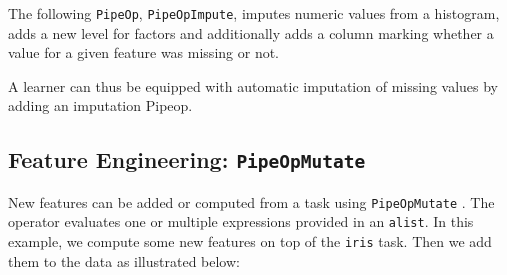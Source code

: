 \documentclass[
  11pt,
  parskip=half,
  DIV=calc,
  BCOR=10mm,
  x11names]{scrbook}
\newenvironment{Shaded}{}{}
\newcommand{\DataTypeTok}[1]{#1}
\newcommand{\KeywordTok}[1]{\textcolor[rgb]{0.00,0.00,1.00}{#1}}
\newcommand{\NormalTok}[1]{#1}
\newcommand{\OperatorTok}[1]{#1}
\newcommand{\StringTok}[1]{\textcolor[rgb]{0.00,0.50,0.50}{#1}}
\begin{document}
The following \texttt{PipeOp}, \texttt{PipeOpImpute}, imputes numeric values from a histogram, adds a new level for factors and additionally adds a column marking whether a value for a given feature was missing or not.

\begin{Shaded}
\end{Shaded}

A learner can thus be equipped with automatic imputation of missing values by adding an imputation Pipeop.

\begin{Shaded}
\end{Shaded}

\hypertarget{feature-engineering-pipeopmutate}{%
\subsection{\texorpdfstring{Feature Engineering: \texttt{PipeOpMutate}}{Feature Engineering: PipeOpMutate}}\label{feature-engineering-pipeopmutate}}

New features can be added or computed from a task using \texttt{PipeOpMutate} .
The operator evaluates one or multiple expressions provided in an \texttt{alist}.
In this example, we compute some new features on top of the \texttt{iris} task.
Then we add them to the data as illustrated below:
\end{document}
